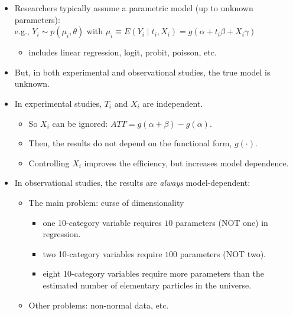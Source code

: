 \documentclass[20pt,landscape,pdftex]{foils}
\begin{document}
\begin{itemize}
\item Researchers typically assume a parametric model (up to unknown
  parameters):\\ e.g., $Y_i \sim p(\mu_i, \theta)$ with $\mu_i \equiv
  E(Y_i \mid t_i, X_i)=g(\alpha+t_i \beta + X_i \gamma)$\pause
  \begin{itemize}
  \item includes linear regression, logit, probit, poisson, etc.\pause 
  \end{itemize}
  
\item But, in both experimental and observational studies, the true
  model is unknown.\pause

\item In experimental studies, $T_i$ and $X_i$ are independent.\pause
  \begin{itemize}
  \item So $X_i$ can be ignored: $ATT = g(\alpha+\beta) - g(\alpha).$\pause
  \item Then, the results do not depend on the functional form,
    $g(\cdot)$.\pause
  \item Controlling $X_i$ improves the efficiency, but increases
    model dependence.\pause
  \end{itemize}
  
\item In observational studies, the results are {\it always}
  model-dependent:\pause
\begin{itemize}
  \item The main problem: curse of dimensionality\pause
    \begin{itemize}
    \item one 10-category variable requires $10$ parameters (NOT one)
      in regression.\pause
    \item two 10-category variables require $100$ parameters (NOT two).\pause
    \item eight 10-category variables require more parameters than the
      estimated number of elementary particles in the universe.\pause
    \end{itemize}
  \item Other problems: non-normal data, etc.\pause
  \end{itemize}
\end{itemize}

\end{document}
